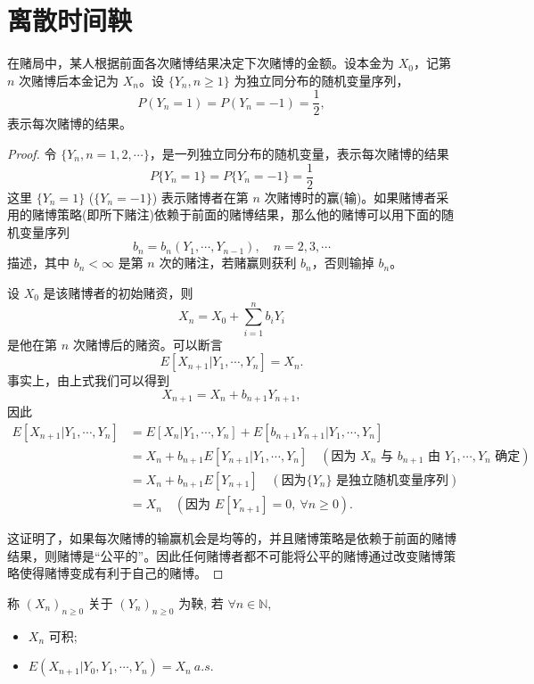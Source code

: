 \documentclass[lang=cn,10pt,thmcnt=section]{elegantbook}
\begin{document}
\section{离散时间鞅}
\begin{example}
	在赌局中，某人根据前面各次赌博结果决定下次赌博的金额。设本金为 $X_0$，记第 $n$ 次赌博后本金记为 $X_n$。设 $\{Y_n, n \geq 1\}$ 为独立同分布的随机变量序列，
\[
P(Y_n = 1) = P(Y_n = -1) = \frac{1}{2},
\]
表示每次赌博的结果。

\end{example}
\begin{proof}
	令 $\{Y_n, n = 1, 2, \cdots\}$，是一列独立同分布的随机变量，表示每次赌博的结果
	\[
	P\{Y_n = 1\} = P\{Y_n = -1\} = \frac{1}{2}
	\]
	这里 $\{Y_n = 1\}$ ($\{Y_n = -1\}$) 表示赌博者在第 $n$ 次赌博时的赢(输)。如果赌博者采用的赌博策略(即所下赌注)依赖于前面的赌博结果，那么他的赌博可以用下面的随机变量序列
	\[
	b_n = b_n(Y_1, \cdots, Y_{n-1}), \quad n = 2, 3, \cdots
	\]
	描述，其中 $b_n < \infty$ 是第 $n$ 次的赌注，若赌赢则获利 $b_n$，否则输掉 $b_n$。
	
	设 $X_0$ 是该赌博者的初始赌资，则
	\[
	X_n = X_0 + \sum_{i=1}^{n} b_i Y_i 
	\]
	是他在第 $n$ 次赌博后的赌资。可以断言
	\[
	E[X_{n+1} | Y_1, \cdots, Y_n] = X_n.
	\]
	事实上，由上式我们可以得到
	\[
	X_{n+1} = X_n + b_{n+1} Y_{n+1},
	\]
	因此
	\begin{align*}
	E[X_{n+1} | Y_1, \cdots, Y_n] &= E[X_n | Y_1, \cdots, Y_n] + E[b_{n+1} Y_{n+1} | Y_1, \cdots, Y_n] \\
	&= X_n + b_{n+1} E[Y_{n+1} | Y_1, \cdots, Y_n] \quad (\text{因为 } X_n \text{ 与 } b_{n+1} \text{ 由 } Y_1, \cdots, Y_n \text{ 确定}) \\
	&= X_n + b_{n+1} E[Y_{n+1}] \quad (\text{因为} \{Y_n\} \text{ 是独立随机变量序列}) \\
	&= X_n \quad (\text{因为 } E[Y_{n+1}] = 0, \ \forall n \geq 0).
	\end{align*}
	
	这证明了，如果每次赌博的输赢机会是均等的，并且赌博策略是依赖于前面的赌博结果，则赌博是“公平的”。因此任何赌博者都不可能将公平的赌博通过改变赌博策略使得赌博变成有利于自己的赌博。
	

	
\end{proof}
\begin{definition}[鞅]
	称 $(X_n)_{n \geq 0}$ 关于 $(Y_n)_{n \geq 0}$ 为鞅, 若 $\forall n \in \mathbb{N}$,
\begin{itemize}
    \item $X_n$ 可积;
    \item $E(X_{n+1} | Y_0, Y_1, \cdots, Y_n) = X_n \ a.s.$
\end{itemize}
\end{definition}
\end{document}

